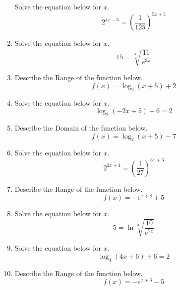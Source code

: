 \documentclass[14pt]{extbook}
\begin{document}
\begin{enumerate}
{Solve the equation below for $x$.\[ 2^{4x-5} = \left(\frac{1}{125}\right)^{5x+5} \]} \newpage
\item{
Solve the equation below for $x$.\[  15 = \sqrt[4]{\frac{11}{e^{3x}}} \]} \newpage
\item{
Describe the Range of the function below.\[ f(x) = \log_2{(x+5)}+2 \]} \newpage
\item{
Solve the equation below for $x$.\[ \log_{2}{(-2x+5)}+6 = 2 \]} \newpage
\item{
Describe the Domain of the function below.\[ f(x) = \log_2{(x+5)}-7 \]} \newpage
\item{
Solve the equation below for $x$.\[ 2^{2x+4} = \left(\frac{1}{27}\right)^{3x+3} \]} \newpage
\item{
Describe the Range of the function below.\[ f(x) = -e^{x+8}+5 \]} \newpage
\item{
Solve the equation below for $x$.\[  5 = \ln{\sqrt[3]{\frac{10}{e^{7x}}}} \]} \newpage
\item{
Solve the equation below for $x$.\[ \log_{4}{(4x+6)}+6 = 2 \]} \newpage
\item{
Describe the Range of the function below.\[ f(x) = -e^{x+3}-5 \]} \newpage
\end{enumerate}
\end{document}
